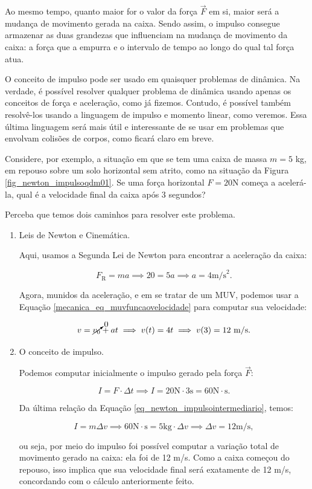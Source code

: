 Ao mesmo tempo, quanto maior for o valor da força $\vec F$ em si, maior será a mudança de movimento gerada na caixa. Sendo assim, o impulso consegue armazenar as duas grandezas que influenciam na mudança de movimento da caixa: a força que a empurra e o intervalo de tempo ao longo do qual tal força atua.



O conceito de impulso pode ser usado em quaisquer problemas de dinâmica. Na verdade, é possível resolver qualquer problema de dinâmica usando apenas os conceitos de força e aceleração, como já fizemos. Contudo, é possível também resolvê-los usando a linguagem de impulso e momento linear, como veremos. Essa última linguagem será mais útil e interessante de se usar em problemas que envolvam colisões de corpos, como ficará claro em breve.

Considere, por exemplo, a situação em que se tem uma caixa de massa $m=5$ kg, em repouso sobre um solo horizontal sem atrito, como na situação da Figura \ref{fig_newton_impulsoqdm01}. Se uma força horizontal $F=20$N começa a acelerá-la, qual é a velocidade final da caixa após $3$ segundos?

Perceba que temos dois caminhos para resolver este problema. 


\begin{enumerate}
    \item Leis de Newton e Cinemática.

    Aqui, usamos a Segunda Lei de Newton para encontrar a aceleração da caixa:

    $$ F_{\text{R}} = ma \implies 20 = 5a \implies a = 4 \text{m/s}^2. $$

    Agora, munidos da aceleração, e em se tratar de um MUV, podemos usar a Equação \eqref{mecanica_eq_muvfuncaovelocidade} para computar sua velocidade:

    $$ v= \cancelto{0}{v_0} + at \implies v(t) = 4t \implies v(3) = 12 \text{ m/s.} $$

     \item O conceito de impulso.

     Podemos computar inicialmente o impulso gerado pela força $\vec F:$

     $$I = F \cdot \Delta t \implies I = 20 \text{N} \cdot 3 \text{s} = 60 \text{N}\cdot \text{s}.$$

     Da última relação da Equação \eqref{eq_newton_impulsointermediario}, temos:


     $$ I = m \Delta v \implies 60 \text{N}\cdot \text{s} = 5 \text{kg} \cdot \Delta v \implies \Delta v = 12 \text{m/s}, $$
     
    \noindent ou seja, por meio do impulso foi possível computar a variação total de movimento gerado na caixa: ela foi de 12 m/s. Como a caixa começou do repouso, isso implica que sua velocidade final será exatamente de 12 m/s, concordando com o cálculo anteriormente feito.
     
\end{enumerate}

